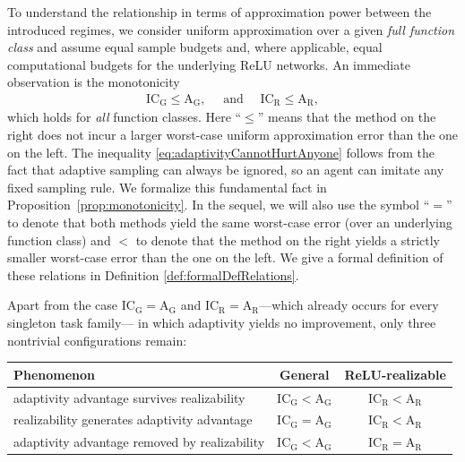 \documentclass{article}
\newcommand{\ICG}{\mathrm{IC_G}}
\newcommand{\ICR}{\mathrm{IC_R}}
\newcommand{\AG}{\mathrm{A_G}}
\newcommand{\AR}{\mathrm{A_R}}
\begin{document}
To understand the relationship in terms of approximation power between the introduced regimes, %
we consider uniform approximation over a given \emph{full function class} and assume equal sample budgets and, where applicable, equal computational budgets for the underlying ReLU networks.
An immediate observation is the monotonicity
\begin{align}
\label{eq:adaptivityCannotHurtAnyone}
\ICG\leq \AG,
\quad\text{ and }\quad
\ICR\leq \AR,
\end{align}
which holds for \emph{all} function classes. 
Here ``$\leq$'' means that the method on the right does not incur a larger worst-case uniform approximation error than the one on the left. %
The inequality \eqref{eq:adaptivityCannotHurtAnyone} follows from the fact that adaptive sampling can always be ignored, so an agent can imitate any fixed sampling rule.
We formalize this fundamental fact in Proposition~\ref{prop:monotonicity}.
In the sequel, we will also use the symbol ``$=$'' to denote that both methods yield the same worst-case error (over an underlying function class) and $<$ to denote that the method on the right yields a strictly smaller worst-case error than the one on the left. 
We give a formal definition of these relations in Definition \ref{def:formalDefRelations}.

Apart from the case $\ICG=\AG$ and $\ICR=\AR$---which already occurs for every singleton task
family---%
in which adaptivity yields no improvement, only three nontrivial configurations remain:

\begin{center}
\begin{tabular}{lcc}
\hline
\textbf{Phenomenon} & \textbf{General} & \textbf{ReLU-realizable} \\
\hline
adaptivity advantage survives realizability & $\ICG<\AG$ & $\ICR<\AR$ \\
realizability generates adaptivity advantage & $\ICG=\AG$ & $\ICR<\AR$ \\
adaptivity advantage removed by realizability & $\ICG<\AG$ & $\ICR=\AR$ \\
\hline
\end{tabular}
\end{center}
\end{document}
